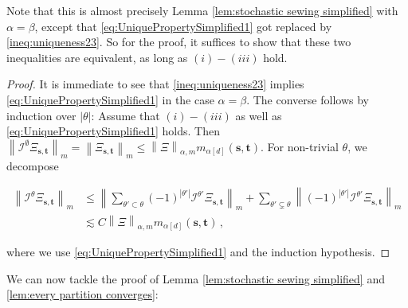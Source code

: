 \documentclass[11pt,oneside,english,reqno]{amsart}
\numberwithin{equation}{section}
\numberwithin{figure}{section}
\theoremstyle{plain}
\theoremstyle{definition}
\theoremstyle{remark}
\theoremstyle{plain}
\theoremstyle{plain}
\theoremstyle{plain}
\theoremstyle{plain}
\theoremstyle{plain}
\newcommand{\cI}{\mathcal{I}}
\newcommand{\bs}{\mathbf{s}}
\newcommand{\bt}{\mathbf{t}}
\newcommand{\norm}[1]{\left\lVert #1\right\rVert}
\newcommand{\abs}[1]{\left\lvert #1\right\rvert}
\begin{document}
\noindent Note that this is almost precisely Lemma \ref{lem:stochastic sewing simplified} with $\alpha = \beta$, except that \eqref{eq:UniquePropertySimplified1} got replaced by \eqref{ineq:uniqueness23}. So for the proof, it suffices to show that these two inequalities are equivalent, as long as $(i)-(iii)$ hold. 

\begin{proof}
    It is immediate to see that \eqref{ineq:uniqueness23} implies \eqref{eq:UniquePropertySimplified1} in the case $\alpha = \beta$. The converse follows by induction over $\abs\theta$: Assume that $(i)-(iii)$ as well as \eqref{eq:UniquePropertySimplified1} holds. Then $\norm{\cI^\emptyset\Xi_{\bs,\bt}}_m = \norm{\Xi_{\bs,\bt}}_m \le \norm{\Xi}_{\alpha,m} m_{\alpha[d]}(\bs,\bt)$. For non-trivial $\theta$, we decompose

    \begin{align*}
        \norm{\cI^\theta \Xi_{\bs,\bt}}_m &\le \norm{\sum_{\theta'\subset\theta}(-1)^{\abs{\theta'}} \cI^{\theta'}\Xi_{\bs,\bt}}_m + \sum_{\theta'\subsetneq\theta}\norm{(-1)^{\abs{\theta'}} \cI^{\theta'}\Xi_{\bs,\bt}}_m\\
        &\lesssim C\norm{\Xi}_{\alpha,m} m_{\alpha[d]}(\bs,\bt)\,,
    \end{align*}

    \noindent where we use \eqref{eq:UniquePropertySimplified1} and the induction hypothesis.
\end{proof}

\noindent We can now tackle the proof of Lemma \ref{lem:stochastic sewing simplified} and \ref{lem:every partition converges}:
\end{document}
